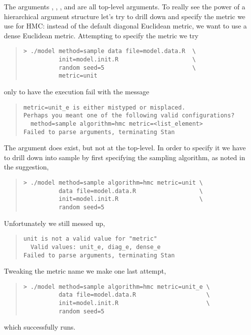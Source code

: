 The arguments , , , and
 are all top-level arguments.  To really see the power of
a hierarchical argument structure let's try to drill down and specify
the metric we use for HMC: instead of the default diagonal Euclidean
metric, we want to use a dense Euclidean metric.  Attempting to
specify the metric we try
%
\begin{quote}
\begin{Verbatim}[fontshape=sl]
> ./model method=sample data file=model.data.R  \
          init=model.init.R                     \
          random seed=5                         \
          metric=unit
\end{Verbatim}
\end{quote}
%
only to have the execution fail with the message
%
\begin{quote}
\begin{Verbatim}
metric=unit_e is either mistyped or misplaced.
Perhaps you meant one of the following valid configurations?
  method=sample algorithm=hmc metric=<list_element>
Failed to parse arguments, terminating Stan
\end{Verbatim}
\end{quote}
%
The argument  does exist, but not at the top-level.  In order
to specify it we have to drill down into sample by first specifying the
sampling algorithm, as noted in the suggestion,
%
\begin{quote}
\begin{Verbatim}[fontshape=sl]
> ./model method=sample algorithm=hmc metric=unit \
          data file=model.data.R                  \
          init=model.init.R                       \
          random seed=5       
\end{Verbatim}
\end{quote}
%
Unfortunately we still messed up,
%
\begin{quote}
\begin{Verbatim}
unit is not a valid value for "metric"
  Valid values: unit_e, diag_e, dense_e
Failed to parse arguments, terminating Stan
\end{Verbatim}
\end{quote}
%
Tweaking the metric name we make one last attempt,
%
\begin{quote}
\begin{Verbatim}[fontshape=sl]
> ./model method=sample algorithm=hmc metric=unit_e \
          data file=model.data.R                    \
          init=model.init.R                         \
          random seed=5
\end{Verbatim}
\end{quote}
%
which successfully runs.

